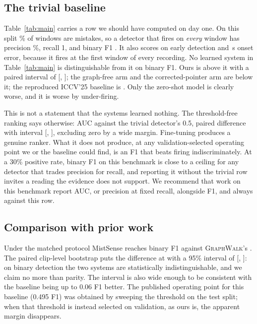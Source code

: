 \documentclass[10pt,twocolumn]{article}
\newcommand{\ourmodel}{\textsc{GraphWalk}}
\begin{document}
\subsection{The trivial baseline}
\label{sec:trivial}

Table~\ref{tab:main} carries a row we should have computed on day one. On this
split \posRate{}\% of windows are mistakes, so a detector that fires on
\emph{every} window has precision \posRate{}\%, recall 1, and binary F1 \afF{}.
It also scores \afEDS{} on early detection and \afMAE{}\,s onset error, because
it fires at the first window of every recording. No learned system in
Table~\ref{tab:main} is distinguishable from it on binary F1. Ours is
\afDelta{} above it with a paired interval of [\afDeltaLo{}, \afDeltaHi{}]; the
graph-free arm and the corrected-pointer arm are below it; the reproduced
ICCV'25 baseline is \baseF{}. Only the zero-shot model is clearly worse, and it
is worse by under-firing.

This is not a statement that the systems learned nothing. The threshold-free
ranking says otherwise: AUC \resAUC{} against the trivial detector's 0.5, paired
difference \afAucDelta{} with interval [\afAucLo{}, \afAucHi{}], excluding zero
by a wide margin. Fine-tuning produces a genuine ranker. What it does not
produce, at any validation-selected operating point we or the baseline could
find, is an F1 that beats firing indiscriminately. At a 30\% positive rate,
binary F1 on this benchmark is close to a ceiling for any detector that trades
precision for recall, and reporting it without the trivial row invites a
reading the evidence does not support. We recommend that work on this benchmark
report AUC, or precision at fixed recall, alongside F1, and always against this
row.

\subsection{Comparison with prior work}
\label{sec:baseline}

Under the matched protocol MistSense reaches \baseF{} binary F1 against
\ourmodel{}'s \resF{}. The paired clip-level bootstrap puts the difference at
\baseDelta{} with a 95\% interval of [\baseDeltaLo{}, \baseDeltaHi{}]: on
binary detection the two systems are statistically indistinguishable, and we
claim no more than parity. The interval is also wide enough to be
consistent with the baseline being up to 0.06 F1 better. The published
operating point for this baseline (0.495 F1) was obtained by sweeping the
threshold on the test split; when that threshold is instead selected on
validation, as ours is, the apparent margin disappears.
\end{document}
